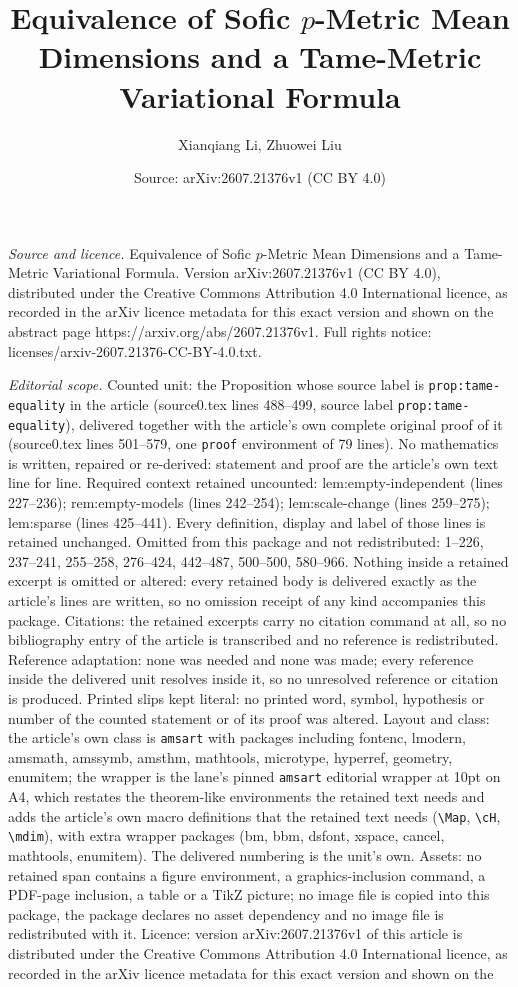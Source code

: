 \documentclass[10pt,a4paper]{amsart}
\title[Equivalence of Sofic $p$-Metric Mean Dimensions and a Tame-M]{Equivalence of Sofic $p$-Metric Mean Dimensions and a Tame-Metric Variational Formula}
\author{Xianqiang Li, Zhuowei Liu}
\date{Source: arXiv:2607.21376v1 (CC BY 4.0)}
\begin{document}
\maketitle

\noindent\emph{Source and licence.} Equivalence of Sofic $p$-Metric Mean Dimensions and a Tame-Metric Variational Formula. Version arXiv:2607.21376v1 (CC BY 4.0), distributed under the Creative Commons Attribution 4.0 International licence, as recorded in the arXiv licence metadata for this exact version and shown on the abstract page https://arxiv.org/abs/2607.21376v1. Full rights notice: licenses/arxiv-2607.21376-CC-BY-4.0.txt.\par\smallskip

\noindent\textit{Editorial scope.} Counted unit: the Proposition whose source label is \texttt{prop:tame-equality} in the article (source0.tex lines 488--499, source label \texttt{prop:tame-equality}), delivered together with the article's own complete original proof of it (source0.tex lines 501--579, one \texttt{proof} environment of 79 lines). No mathematics is written, repaired or re-derived: statement and proof are the article's own text line for line. Required context retained uncounted: lem:empty-independent (lines 227--236); rem:empty-models (lines 242--254); lem:scale-change (lines 259--275); lem:sparse (lines 425--441). Every definition, display and label of those lines is retained unchanged. Omitted from this package and not redistributed: 1--226, 237--241, 255--258, 276--424, 442--487, 500--500, 580--966. Nothing inside a retained excerpt is omitted or altered: every retained body is delivered exactly as the article's lines are written, so no omission receipt of any kind accompanies this package. Citations: the retained excerpts carry no citation command at all, so no bibliography entry of the article is transcribed and no reference is redistributed. Reference adaptation: none was needed and none was made; every reference inside the delivered unit resolves inside it, so no unresolved reference or citation is produced. Printed slips kept literal: no printed word, symbol, hypothesis or number of the counted statement or of its proof was altered. Layout and class: the article's own class is \texttt{amsart} with packages including fontenc, lmodern, amsmath, amssymb, amsthm, mathtools, microtype, hyperref, geometry, enumitem; the wrapper is the lane's pinned \texttt{amsart} editorial wrapper at 10pt on A4, which restates the theorem-like environments the retained text needs and adds the article's own macro definitions that the retained text needs (\texttt{\textbackslash Map}, \texttt{\textbackslash cH}, \texttt{\textbackslash mdim}), with extra wrapper packages (bm, bbm, dsfont, xspace, cancel, mathtools, enumitem). The delivered numbering is the unit's own. Assets: no retained span contains a figure environment, a graphics-inclusion command, a PDF-page inclusion, a table or a TikZ picture; no image file is copied into this package, the package declares no asset dependency and no image file is redistributed with it. Licence: version arXiv:2607.21376v1 of this article is distributed under the Creative Commons Attribution 4.0 International licence, as recorded in the arXiv licence metadata for this exact version and shown on the 
\end{document}
